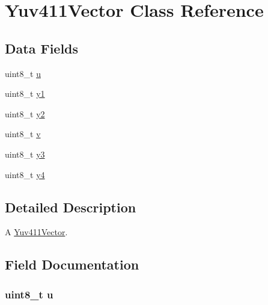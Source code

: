 \hypertarget{classUtility_1_1Yuv411Vector}{}\section{Yuv411\+Vector Class Reference}
\label{classUtility_1_1Yuv411Vector}
\subsection*{Data Fields}
\begin{DoxyCompactItemize}
\item 
uint8\+\_\+t \hyperlink{classUtility_1_1Yuv411Vector_a02ae6f520370d7aaa739c73180f091b2}{u}
\item 
uint8\+\_\+t \hyperlink{classUtility_1_1Yuv411Vector_af2a4bde7e1b01cf2f420295ee22cf94f}{y1}
\item 
uint8\+\_\+t \hyperlink{classUtility_1_1Yuv411Vector_ab46d53655890336d982ec8600a4c5f65}{y2}
\item 
uint8\+\_\+t \hyperlink{classUtility_1_1Yuv411Vector_a467db8c58dd86cf7c97848f9fc85a4c8}{v}
\item 
uint8\+\_\+t \hyperlink{classUtility_1_1Yuv411Vector_a7f30cd571b8069087b6f2477bdfbc24a}{y3}
\item 
uint8\+\_\+t \hyperlink{classUtility_1_1Yuv411Vector_a028d192d7e544c837a59835942f67b33}{y4}
\end{DoxyCompactItemize}


\subsection{Detailed Description}
A \hyperlink{classUtility_1_1Yuv411Vector}{Yuv411\+Vector}. 

\subsection{Field Documentation}
\hypertarget{classUtility_1_1Yuv411Vector_a02ae6f520370d7aaa739c73180f091b2}{}
\subsubsection[{u}]{\setlength{\rightskip}{0pt plus 5cm}uint8\+\_\+t u}\label{classUtility_1_1Yuv411Vector_a02ae6f520370d7aaa739c73180f091b2}
\hypertarget{classUtility_1_1Yuv411Vector_a467db8c58dd86cf7c97848f9fc85a4c8}{}
